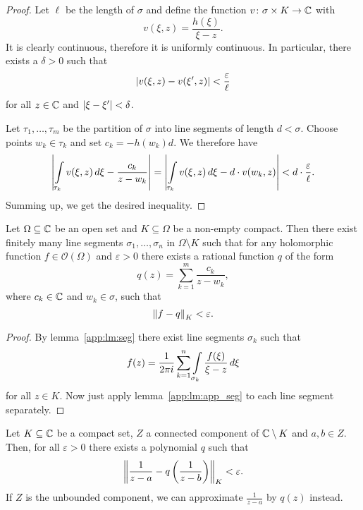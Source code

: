 \begin{proof}
Let $\ell$ be the length of $\sigma$ and define the function
$v \colon \sigma \times K \to \mathbb{C}$ with
\[
v(\xi, z) = \frac{h(\xi)}{\xi - z}.
\]
It is clearly continuous, therefore it is uniformly continuous. In
particular, there exists a $\delta > 0$ such that
\[
\left\lvert v(\xi, z) - v(\xi', z)\right\rvert < \frac{\varepsilon}{\ell}
\]
for all $z \in \mathbb{C}$ and $\left\lvert \xi - \xi'\right\rvert < \delta$.

Let $\tau_1, \dots, \tau_m$ be the partition of $\sigma$ into line
segments of length $d < \sigma$. Choose points $w_k \in \tau_k$ and
set $c_k = - h(w_k) d$. We therefore have
\[
\left\lvert \int\limits_{\tau_k} v(\xi, z)\,d\xi - \frac{c_k}{z - w_k}\right\rvert =
\left\lvert \int\limits_{\tau_k} v(\xi, z)\,d\xi - d \cdot v(w_k, z)\right\rvert <
d \cdot \frac{\varepsilon}{\ell}.
\]
Summing up, we get the desired inequality.
\end{proof}

\begin{lema}\label{app:lm:app_by_rat}
Let $\Omega \subseteq \mathbb{C}$ be an open set and $K \subseteq \Omega$
be a non-empty compact. Then there exist finitely many line
segments $\sigma_1, \dots, \sigma_n$ in $\Omega \setminus K$ such
that for any holomorphic function $f \in \mathcal{O}(\Omega)$ and
$\varepsilon > 0$ there exists a rational function $q$ of the form
\[
q(z) = \sum_{k=1}^m \frac{c_k}{z - w_k},
\]
where $c_k \in \mathbb{C}$ and $w_k \in \sigma$, such that
\[
\left\lVert f - q\right\rVert_K < \varepsilon.
\]
\end{lema}

\begin{proof}
By lemma~\ref{app:lm:seg} there exist line segments $\sigma_k$ such
that
\[
f(z) = \frac{1}{2 \pi i} \sum_{k=1}^n
\int\limits_{\sigma_k} \frac{f(\xi)}{\xi - z}\,d\xi
\]
for all $z \in K$. Now just apply lemma~\ref{app:lm:app_seg} to
each line segment separately.
\end{proof}


\begin{lema}
Let $K \subseteq \mathbb{C}$ be a compact set, $Z$ a connected component of
$\mathbb{C} \setminus K$ and $a, b \in Z$. Then, for all $\varepsilon > 0$
there exists a polynomial $q$ such that
\[
\left\lVert \frac{1}{z-a} - q \left(\frac{1}{z-b}\right)\right\rVert_K < \varepsilon.
\]
If $Z$ is the unbounded component, we can approximate
$\frac{1}{z-a}$ by $q(z)$ instead.
\end{lema}

